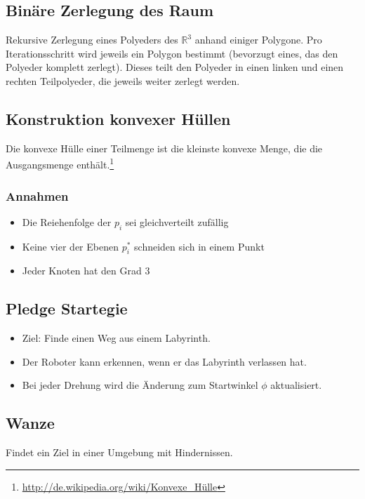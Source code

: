 \subsection{Binäre Zerlegung des Raum}
Rekursive Zerlegung eines Polyeders des \(\mathbb{R}^3\) anhand einiger Polygone. Pro Iterationsschritt wird jeweils ein Polygon bestimmt (bevorzugt eines, das den Polyeder komplett zerlegt). Dieses teilt den Polyeder in einen linken und einen rechten Teilpolyeder, die jeweils weiter zerlegt werden.
\text{}\\



\subsection{Konstruktion konvexer Hüllen}
Die konvexe Hülle einer Teilmenge ist die kleinste konvexe Menge, die die Ausgangsmenge enthält.\footnote{\url{http://de.wikipedia.org/wiki/Konvexe_Hülle}}

\subsubsection{Annahmen}
\begin{itemize}
	\item Die Reiehenfolge der \(p_i\) sei gleichverteilt zufällig
	\item Keine vier der Ebenen \(p_i^{*}\) schneiden sich in einem Punkt
	\item Jeder Knoten hat den Grad \(3\)
\end{itemize}



\subsection{Pledge Startegie}
\begin{itemize}
	\item Ziel: Finde einen Weg aus einem Labyrinth.
	\item Der Roboter kann erkennen, wenn er das Labyrinth verlassen hat.
	\item Bei jeder Drehung wird die Änderung zum Startwinkel \(\phi\) aktualisiert.
\end{itemize}



\subsection{Wanze}
Findet ein Ziel in einer Umgebung mit Hindernissen.
\text{}\\


